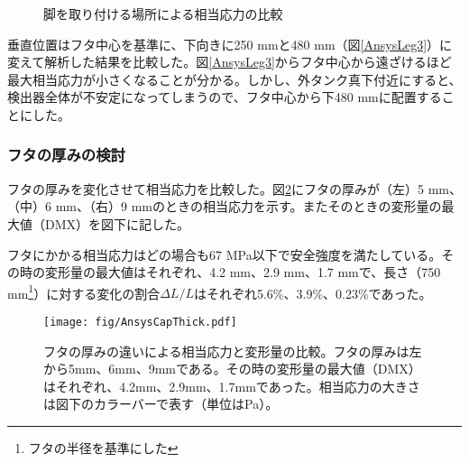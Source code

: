 \documentclass[11pt]{jreport}
\newcommand{\figref}[1]{図\ref{#1}}
\begin{document}
\begin{figure}[htbp]
  \begin{minipage}{1\textwidth}
  \end{minipage}
  \hfill
  \begin{minipage}{0.47\textwidth}
  \end{minipage}
  \hfill
  \begin{minipage}{0.47\textwidth}
  \end{minipage}
    \caption{脚を取り付ける場所による相当応力の比較}
  \label{AnsysLeg}
\end{figure}
\fi%

垂直位置はフタ中心を基準に、下向きに250 mmと480 mm（\figref{AnsysLeg3}）に変えて解析した結果を比較した。\figref{AnsysLeg3}からフタ中心から遠ざけるほど最大相当応力が小さくなることが分かる。しかし、外タンク真下付近にすると、検出器全体が不安定になってしまうので、フタ中心から下480 mmに配置することにした。


\subsubsection{フタの厚みの検討}
フタの厚みを変化させて相当応力を比較した。\figref{AnsysCapThick}にフタの厚みが（左）5 mm、（中）6 mm、（右）9 mmのときの相当応力を示す。またそのときの変形量の最大値（DMX）を図下に記した。

フタにかかる相当応力はどの場合も67 MPa以下で安全強度を満たしている。その時の変形量の最大値はそれぞれ、4.2 mm、2.9 mm、1.7 mmで、長さ（750 mm\footnote{フタの半径を基準にした}）に対する変化の割合$\Delta L/L$はそれぞれ5.6\%、3.9\%、0.23\%であった。

\begin{figure}[htbp]
\centering
\texttt{[image: fig/AnsysCapThick.pdf]}
\caption[フタの厚みの違いによる相当応力と変形量の比較]{フタの厚みの違いによる相当応力と変形量の比較。フタの厚みは左から5mm、6mm、9mmである。その時の変形量の最大値（DMX）はそれぞれ、4.2mm、2.9mm、1.7mmであった。相当応力の大きさは図下のカラーバーで表す（単位はPa）。}
\label{AnsysCapThick}
\end{figure}
\end{document}

